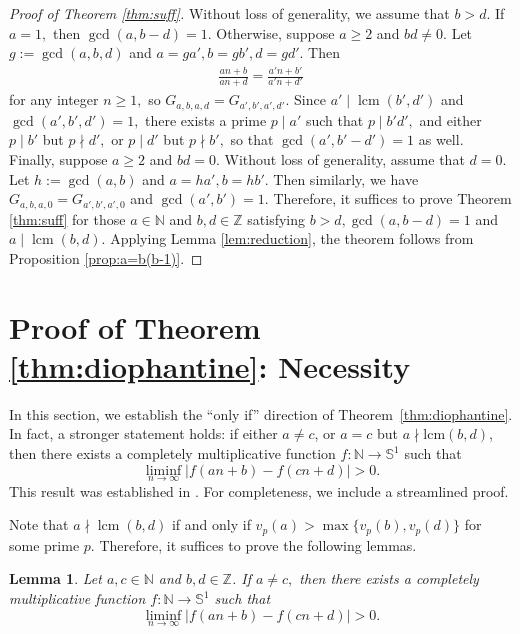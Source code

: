 \documentclass[12pt, reqno, a4paper]{amsart}
\newtheorem{lemma}{Lemma}[section]
\theoremstyle{definition}
\theoremstyle{remark}
\numberwithin{equation}{section}
\newcommand{\N}{\mathbb{N}}
\newcommand{\Z}{\mathbb{Z}}
\renewcommand{\geq}{\geqslant}
\begin{document}
\begin{proof}[Proof of Theorem \ref{thm:suff}]
 Without loss of generality, we assume that $b>d.$ If $a=1,$ then $\gcd (a,b-d)=1.$ Otherwise, suppose $a \geq 2$ and $bd \neq 0.$
 Let $g:=\gcd(a,b,d)$ and $a=ga', b=gb',d=gd'.$ Then
 \begin{align*}
 \frac{an+b}{an+d}=\frac{a'n+b'}{a'n+d'}
 \end{align*}
 for any integer $n \geq 1,$ so $G_{a,b,a,d}=G_{a',b',a',d'}.$
 Since $a' \mid \operatorname{lcm}(b',d')$ and $\gcd (a',b',d')=1,$ there exists a prime $p \mid a'$ such that $p \mid b'd',$ and either $p \mid b'$ but $p \nmid d',$ or $p \mid d'$ but $p \nmid b',$ so that $\gcd (a',b'-d')=1$ as well. Finally, suppose $a \geq 2$ and $bd = 0.$ Without loss of generality, assume that $d=0.$ Let $h:=\gcd(a,b)$ and $a=ha', b=hb'.$ Then similarly, we have $G_{a,b,a,0}=G_{a',b',a',0}$ and $\gcd (a',b')=1.$ Therefore, it suffices to prove Theorem \ref{thm:suff} for those $a \in \mathbb{N}$ and $b,d \in \mathbb{Z}$ satisfying $b>d, \gcd(a,b-d)=1$ and $a \mid \operatorname{lcm}(b,d).$ Applying Lemma \ref{lem:reduction}, the theorem follows from Proposition \ref{prop:a=b(b-1)}. 
\end{proof}

\section{Proof of Theorem \ref{thm:diophantine}: Necessity} \label{sec:dio_nec}

In this section, we establish the ``only if'' direction of Theorem~\ref{thm:diophantine}. In fact, a stronger statement holds: if either \( a \neq c \), or \( a = c \) but \( a \nmid \mathrm{lcm}(b,d) \), then there exists a completely multiplicative function \( f : \mathbb{N} \to \mathbb{S}^1 \) such that
\[
\liminf_{n \to \infty} \left| f(an + b) - f(cn + d) \right| > 0.
\]
This result was established in \cite[Propositions 2 and 3]{charamaras2024multiplicativerecurrencelinearpatterns}. For completeness, we include a streamlined proof.

Note that $a \nmid \operatorname{lcm}(b,d)$ if and only if $v_p(a)>\max\{v_p(b), v_p(d) \}$ for some prime $p.$ Therefore, it suffices to prove the following lemmas.

 \begin{lemma}
 Let $a,c\in\N$ and $b,d\in\Z$. If $a \neq c,$ then there exists a completely multiplicative function $f:\N\to \mathbb{S}^1$ such that
  \[ \liminf_{n\to\infty} |f(an+b)-f(cn+d)| > 0. \]
 \end{lemma}
\end{document}
